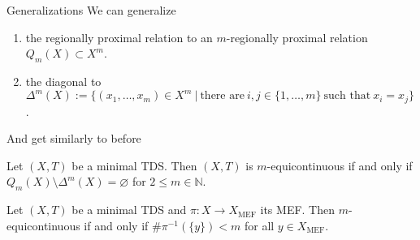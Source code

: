 \begin{frame}{Generalizations}
    We can generalize
    \begin{enumerate}
        \item the regionally proximal relation to an $m$-regionally proximal relation $Q_m(X) \subset X^{m}$.
        \item the diagonal to 
        $\Delta^m(X) := \{ (x_1, \dots, x_m) \in X^m \ | \ \text{there are} \ i, j \in \{1, \dots, m\} \ \text{such that} \ x_i = x_j \}$.
    \end{enumerate}

\end{frame}

\begin{frame}
    And get similarly to before
    \begin{theorem}
	    \label{thm:m-equiRelationChar}
	    Let $(X, T)$ be a minimal TDS.
	    Then $(X, T)$ is $m$-equicontinuous if and only if $Q_m(X) \setminus \Delta^m(X) = \varnothing$ for $2 \leq m \in \mathbb{N}$.
    \end{theorem}
    \pause
    \begin{corollary}
        Let $(X, T)$ be a minimal TDS and $\pi : X \to X_\text{MEF}$ its MEF.
        Then $m$-equicontinuous if and only if $\# \pi^{-1}(\{ y \}) < m$ for all $y \in X_\text{MEF}$.
    \end{corollary} 
\end{frame}